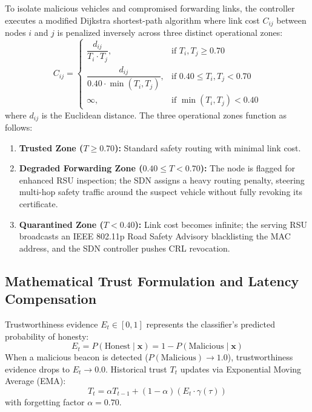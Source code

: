 \documentclass[conference]{IEEEtran}
\begin{document}
To isolate malicious vehicles and compromised forwarding links, the controller executes a modified Dijkstra shortest-path algorithm where link cost $C_{ij}$ between nodes $i$ and $j$ is penalized inversely across three distinct operational zones:
\begin{equation}
C_{ij} = \begin{cases} 
\dfrac{d_{ij}}{T_i \cdot T_j}, & \text{if } T_i, T_j \ge 0.70 \\[8pt] 
\dfrac{d_{ij}}{0.40 \cdot \min(T_i, T_j)}, & \text{if } 0.40 \le T_i, T_j < 0.70 \\[8pt] 
\infty, & \text{if } \min(T_i, T_j) < 0.40 
\end{cases}
\label{eq:sdn_cost}
\end{equation}
where $d_{ij}$ is the Euclidean distance. The three operational zones function as follows:
\begin{enumerate}
    \item \textbf{Trusted Zone ($T \ge 0.70$):} Standard safety routing with minimal link cost.
    \item \textbf{Degraded Forwarding Zone ($0.40 \le T < 0.70$):} The node is flagged for enhanced RSU inspection; the SDN assigns a heavy routing penalty, steering multi-hop safety traffic around the suspect vehicle without fully revoking its certificate.
    \item \textbf{Quarantined Zone ($T < 0.40$):} Link cost becomes infinite; the serving RSU broadcasts an IEEE 802.11p Road Safety Advisory blacklisting the MAC address, and the SDN controller pushes CRL revocation.
\end{enumerate}

\subsection{Mathematical Trust Formulation and Latency Compensation}

Trustworthiness evidence $E_t \in [0, 1]$ represents the classifier's predicted probability of honesty:
\begin{equation}
E_t = P(\text{Honest} \mid \mathbf{x}) = 1 - P(\text{Malicious} \mid \mathbf{x})
\label{eq:evidence_def}
\end{equation}
When a malicious beacon is detected ($P(\text{Malicious}) \to 1.0$), trustworthiness evidence drops to $E_t \to 0.0$. Historical trust $T_t$ updates via Exponential Moving Average (EMA):
\begin{equation}
T_t = \alpha T_{t-1} + (1-\alpha) \left(E_t \cdot \gamma(\tau)\right)
\label{eq:ema_trust}
\end{equation}
with forgetting factor $\alpha = 0.70$. 
\end{document}
